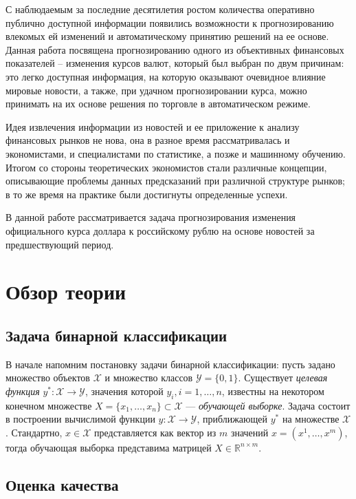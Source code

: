 \documentclass[pdftex,14pt,a4paper]{extreport}
\begin{document}
С наблюдаемым за последние десятилетия ростом количества оперативно публично доступной информации появились возможности к прогнозированию влекомых ей изменений
и автоматическому принятию решений на ее основе.
Данная работа посвящена прогнозированию одного из объективных финансовых показателей -- изменения курсов валют, который был выбран по двум причинам: это легко доступная информация,
на которую оказывают очевидное влияние мировые новости, а также, при удачном прогнозировании курса, можно принимать на их основе решения по торговле в автоматическом режиме.

Идея извлечения информации из новостей и ее приложение к анализу финансовых рынков не нова, она
в разное время рассматривалась и экономистами, и специалистами по статистике, а позже и машинному обучению.
Итогом со стороны теоретических экономистов стали различные концепции,
описывающие проблемы данных предсказаний при различной структуре рынков; в то же время на практике
были достигнуты определенные успехи.

В данной работе рассматривается задача прогнозирования изменения официального курса доллара к российскому рублю
на основе новостей за предшествующий период.

\tableofcontents

\chapter{Обзор теории}

\section{Задача бинарной классификации}

В начале напомним постановку задачи бинарной классификации\cite{bin_classif}: пусть задано множество объектов $\mathcal{X}$ и
множество классов $\mathcal{Y} = \{0,1\}$.  Существует \textit{целевая функция} $y^*:\mathcal{X}\to\mathcal{Y}$,
значения которой $y_i, i=1,\ldots,n$, известны на некотором конечном множестве
$X = \{x_1,\ldots,x_n\} \subset \mathcal{X}$ --- \textit{обучающей выборке}. Задача состоит в построении вычислимой функции
$y:\mathcal{X}\to\mathcal{Y}$, приближающей $y^*$ на множестве $\mathcal{X}$.
Стандартно, $x\in\mathcal{X}$ представляется как вектор из $m$ значений $x=(x^1,\ldots,x^m)$, тогда обучающая выборка
представима матрицей $X\in \mathbb{R}^{n\times m}$.

\section{Оценка качества}
\end{document}
